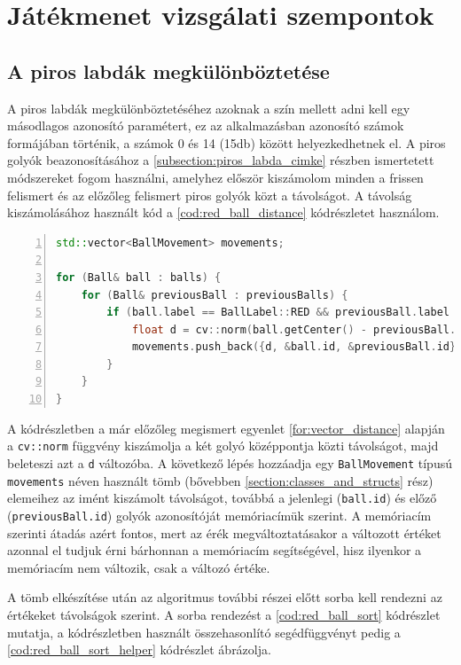 \section{Játékmenet vizsgálati szempontok}
\subsection{A piros labdák megkülönböztetése}
A piros labdák megkülönböztetéséhez azoknak a szín mellett adni kell egy másodlagos azonosító paramétert, ez az alkalmazásban azonosító számok formájában történik, a számok 0 és 14 (15db) között helyezkedhetnek el. A piros golyók beazonosításához a \ref{subsection:piros_labda_cimke} részben ismertetett módszereket fogom használni, amelyhez először kiszámolom minden a frissen felismert és az előzőleg felismert piros golyók közt a távolságot. A távolság kiszámolásához használt kód a \ref{cod:red_ball_distance} kódrészletet használom.

\begin{codewrapper}
\begin{lstlisting}[language=C++, numbers=left, caption={Piros golyók közti távolság kiszámolása.}, label={cod:red_ball_distance}]
std::vector<BallMovement> movements;

for (Ball& ball : balls) {
    for (Ball& previousBall : previousBalls) {
        if (ball.label == BallLabel::RED && previousBall.label == BallLabel::RED) {
            float d = cv::norm(ball.getCenter() - previousBall.getCenter());
            movements.push_back({d, &ball.id, &previousBall.id});
        }
    }
}
\end{lstlisting}
\end{codewrapper}

\par A kódrészletben a már előzőleg megismert egyenlet \ref{for:vector_distance} alapján a \lstinline{cv::norm} függvény\cite{opencv_docs} kiszámolja a két golyó középpontja közti távolságot, majd beleteszi azt a \lstinline{d} változóba. A következő lépés hozzáadja egy \lstinline{BallMovement} típusú \lstinline{movements} néven használt tömb (bővebben \ref{section:classes_and_structs} rész) elemeihez az imént kiszámolt távolságot, továbbá a jelenlegi (\lstinline{ball.id}) és előző (\lstinline{previousBall.id}) golyók azonosítóját memóriacímük szerint. A memóriacím szerinti átadás azért fontos, mert az érék megváltoztatásakor a változott értéket azonnal el tudjuk érni bárhonnan a memóriacím segítségével, hisz ilyenkor a memóriacím nem változik, csak a változó értéke.
\par A tömb elkészítése után az algoritmus további részei előtt sorba kell rendezni az értékeket távolságok szerint. A sorba rendezést a \ref{cod:red_ball_sort} kódrészlet mutatja, a kódrészletben használt összehasonlító segédfüggvényt pedig a \ref{cod:red_ball_sort_helper} kódrészlet ábrázolja.

